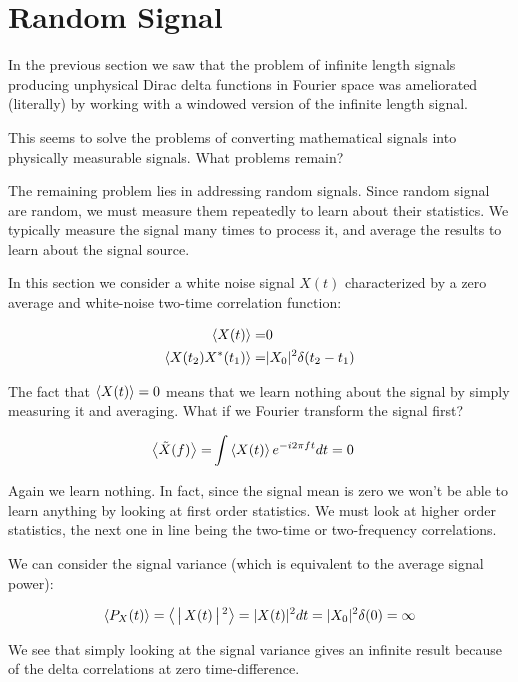 \documentclass[12pt]{article}
\begin{document}
\section{Random Signal}

In the previous section we saw that the problem of infinite length signals producing unphysical Dirac delta functions in Fourier space was ameliorated (literally) by working with a windowed version of the infinite length signal.

This seems to solve the problems of converting mathematical signals into physically measurable signals.
What problems remain?

The remaining problem lies in addressing random signals.
Since random signal are random, we must measure them repeatedly to learn about their statistics.
We typically measure the signal many times to process it, and average the results to learn about the signal source.

In this section we consider a white noise signal $X(t)$ characterized by a zero average and white-noise two-time correlation function:

\begin{align}
\Braket{X(t)} =& 0\\
\Braket{X(t_2)X^*(t_1)} =& |X_0|^2\delta(t_2-t_1)
\end{align}

The fact that $\Braket{X(t)}=0$ means that we learn nothing about the signal by simply measuring it and averaging.
What if we Fourier transform the signal first?

\begin{align}
\Braket{\tilde{X}(f)} =& \int \Braket{X(t)} e^{-i2\pi ft}dt = 0
\end{align}

Again we learn nothing.
In fact, since the signal mean is zero we won't be able to learn anything by looking at first order statistics.
We must look at higher order statistics, the next one in line being the two-time or two-frequency correlations.

We can consider the signal variance (which is equivalent to the average signal power):

\begin{align}
\Braket{P_X(t)} = \Braket{|X(t)|^2} = |X(t)|^2 dt = |X_0|^2 \delta(0) = \infty
\end{align}

We see that simply looking at the signal variance gives an infinite result because of the delta correlations at zero time-difference.
\end{document}
